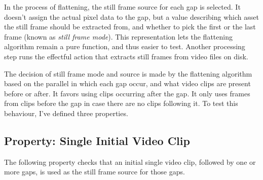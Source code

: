 In the process of flattening, the still frame source for each gap is selected. It doesn't assign the actual pixel data to the gap, but a value describing which asset the still frame should be extracted from, and whether to pick the first or the last frame (known as \textit{still frame mode}). This representation lets the flattening algorithm remain a pure function, and thus easier to test. Another processing step runs the effectful action that extracts still frames from video files on disk.

The decision of still frame mode and source is made by the flattening algorithm based on the parallel in which each gap occur, and what video clips are present before or after. It favors using clips occurring after the gap. It only uses frames from clips before the gap in case there are no clips following it. To test this behaviour, I've defined three properties.

\subsection{Property: Single Initial Video Clip}

The following property checks that an initial single video clip, followed by one or more gaps, is used as the still frame source for those gaps.

